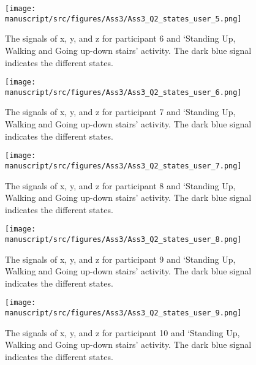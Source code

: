 \begin{figure}[H]
    \centering
    \begin{minipage}[b]{1\textwidth}
        \texttt{[image: manuscript/src/figures/Ass3/Ass3\_Q2\_states\_user\_5.png]}
    \end{minipage}
    \caption{The signals of x, y, and z for participant 6 and ‘Standing  Up,  Walking  and  Going  up-down  stairs’ activity. The dark blue signal indicates the different states.}
    \label{fig:Ass3_Q2_states_user_5}
\end{figure}
\begin{figure}[H]
    \centering
    \begin{minipage}[b]{1\textwidth}
        \texttt{[image: manuscript/src/figures/Ass3/Ass3\_Q2\_states\_user\_6.png]}
    \end{minipage}
    \caption{The signals of x, y, and z for participant 7 and ‘Standing  Up,  Walking  and  Going  up-down  stairs’ activity. The dark blue signal indicates the different states.}
    \label{fig:Ass3_Q2_states_user_6}
\end{figure}
\begin{figure}[H]
    \centering
    \begin{minipage}[b]{1\textwidth}
        \texttt{[image: manuscript/src/figures/Ass3/Ass3\_Q2\_states\_user\_7.png]}
    \end{minipage}
    \caption{The signals of x, y, and z for participant 8 and ‘Standing  Up,  Walking  and  Going  up-down  stairs’ activity. The dark blue signal indicates the different states.}
    \label{fig:Ass3_Q2_states_user_7}
\end{figure}
\begin{figure}[H]
    \centering
    \begin{minipage}[b]{1\textwidth}
        \texttt{[image: manuscript/src/figures/Ass3/Ass3\_Q2\_states\_user\_8.png]}
    \end{minipage}
    \caption{The signals of x, y, and z for participant 9 and ‘Standing  Up,  Walking  and  Going  up-down  stairs’ activity. The dark blue signal indicates the different states.}
    \label{fig:Ass3_Q2_states_user_8}
\end{figure}
\begin{figure}[H]
    \centering
    \begin{minipage}[b]{1\textwidth}
        \texttt{[image: manuscript/src/figures/Ass3/Ass3\_Q2\_states\_user\_9.png]}
    \end{minipage}
    \caption{The signals of x, y, and z for participant 10 and ‘Standing  Up,  Walking  and  Going  up-down  stairs’ activity. The dark blue signal indicates the different states.}
    \label{fig:Ass3_Q2_states_user_9}
\end{figure}
